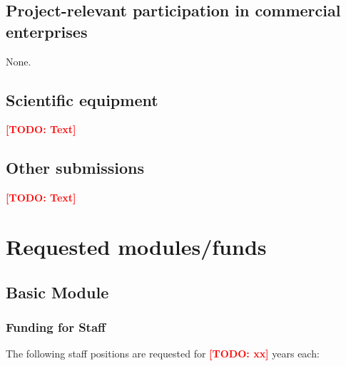 \documentclass{scrartcl}
\newcommand{\todo}[1]{\xspace{\textcolor{red}{\bfseries[TODO: #1]}}\xspace}
\begin{document}
\subsection{Project-relevant participation in commercial enterprises}
None.

\subsection{Scientific equipment}
\todo{Text}

\subsection{Other submissions}
\todo{Text}


\section{Requested modules/funds}

\subsection{Basic Module}

\subsubsection{Funding for Staff}
\begin{funds}
The following staff positions are requested for \todo{xx} years each:


\end{funds}
\end{document}
